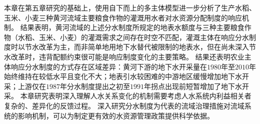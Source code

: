 本章在第五章研究的基础上，使用自下而上的多主体模型进一步分析了生产水稻、玉米、小麦三种黄河流域主要粮食作物的灌溉用水者对水资源分配制度的响应机制。
结果表明，黄河流域的上述分水制度所规定的地表水额度与三种主要粮食作物（水稻、玉米、小麦）的灌溉需求之间存在时空不匹配，灌溉主体在响应分水制度时以节水改革为主，而非简单地用地下水替代被限制的地表水，但在尚未深入节水改革时，违背配额约束很可能是响应制度变化的主要策略。
结果还表明农业主体响应分水制度的方式存在区域差异：黄河下游的地下水开采量在$1980$年至$2010$年始终维持在较低水平且变化不大；地表引水较困难的中游地区缓慢增加地下水开采；上游仅在$1987$年分水制度提出之初至$1991$年拐点出现前短暂增加了地下水开采。
本章研究表明深入理解人水关系变化的机制需要考虑人水系统内利益相关者复杂的、差异化的反馈过程。
深入研究分水制度为代表的流域治理措施对流域系统的影响机制，可以为制定更有效的水资源管理政策提供科学依据。
